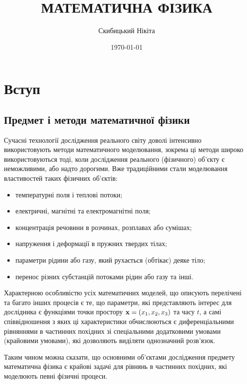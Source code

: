 

\title{{\Huge МАТЕМАТИЧНА ФІЗИКА}}
\author{Скибицький Нікіта}
\date{\today}





\tableofcontents

\section{Вступ}

\subsection{Предмет і методи математичної фізики}

Сучасні технології дослідження реального світу доволі інтенсивно використовують методи математичного моделювання, зокрема ці методи широко використовуються тоді, коли дослідження реального (фізичного) об'єкту є неможливими, або надто дорогими. Вже традиційними стали моделювання властивостей таких фізичних об'єктів:
\begin{itemize}
	\item температурні поля і теплові потоки;
	\item електричні, магнітні та електромагнітні поля;
	\item концентрація речовини в розчинах, розплавах або сумішах;
	\item напруження і деформації в пружних твердих тілах;
	\item параметри рідини або газу, який рухається (обтікає) деяке тіло;
	\item перенос різних субстанцій потоками рідин або газу та інші.
\end{itemize}

Характерною особливістю усіх математичних моделей, що описують перелічені та багато інших процесів є те, що параметри, які представляють інтерес для дослідника є функціями точки простору $\bf{x} = (x_1, x_2, x_3)$ та часу $t$, а самі співвідношення з яких ці характеристики обчислюються є диференціальними рівняннями в частинних похідних зі спеціальними додатковими умовами (крайовими умовами), які дозволяють виділяти однозначний розв'язок. \medskip

Таким чином можна сказати, що основними об'єктами дослідження предмету математична фізика є крайові задачі для рівнянь в частинних похідних, які моделюють певні фізичні процеси. \medskip

